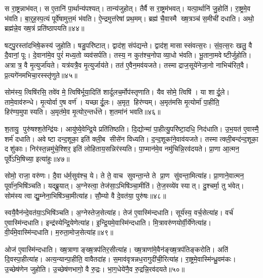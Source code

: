 स रा॒ष्ट्रन्नाभ॑वत्। स ए॒तानि॑ पा॒र्थान्य॑पश्यत्। तान्य॑जुहोत्। तैर्वै स रा॒ष्ट्रम॑भवत्। यत्पा॒र्थानि॑ जु॒होति॑। रा॒ष्ट्रमे॒व भ॑वति। बा॒र्॒ह॒स्प॒त्यं पूर्वे॑षामुत्त॒मं भ॑वति। ऐ॒न्द्रमुत्त॑रेषां प्रथ॒मम्। ब्रह्म॑ चै॒वास्मै ख्ष॒त्रञ्च॑ स॒मीची॑ दधाति। अथो॒ ब्रह्म॑न्ने॒व ख्ष॒त्रं प्रति॑ष्ठापयति॥४४॥

षट्पु॒रस्ता॑दभिषे॒कस्य॑ जुहोति। षडु॒परि॑ष्टात्। द्वाद॑श॒ संप॑द्यन्ते। द्वाद॑श॒ मासास्संवत्स॒रः। सं॒व॒त्स॒रः खलु॒ वै दै॒वानां॒ पूः। दे॒वाना॑मे॒व पुरं॑ मध्य॒तो व्यव॑सर्पति। तस्य॒ न कुत॑श्च॒नोपाव्या॒धो भ॑वति। भू॒ताना॒मवेष्टीर्जुहोति। अत्रात्र॒ वै मृ॒त्युर्जा॑यते। यत्र॑यत्रै॒व मृ॒त्युर्जाय॑ते। तत॑ ए॒वैन॒मव॑यजते। तस्माद्राज॒सूये॑नेजा॒नो नाभिच॑रित॒वै। प्र॒त्यगे॑नमभिचा॒रस्स्तृ॑णुते॥४५॥\anuvakamend[रु॒न्धे॒ सम॑ष्ट्या असिच्यत स्थापयति॒ जाय॑ते॒ पञ्च॑ च]

सोम॑स्य॒ त्विषि॑रसि॒ तवे॑व मे॒ त्विषि॑र्भूया॒दिति॑ शार्दूलच॒र्मोप॑स्तृणाति। यैव सोमे॒ त्विषि॑। या शार्दू॒ले। तामे॒वाव॑रुन्धे। मृ॒त्योर्वा ए॒ष वर्ण॑। यच्छार्दू॒लः। अ॒मृत॒ हिर॑ण्यम्। अ॒मृत॑मसि मृ॒त्योर्मा॑ पा॒हीति॒ हिर॑ण्य॒मुपास्यति। अ॒मृत॑मे॒व मृ॒त्योर॒न्तर्ध॑त्ते। श॒तमा॑नं भवति॥४६॥

श॒तायु॒ पुरु॑षश्श॒तेन्द्रि॑यः। आयु॑ष्ये॒वेन्द्रि॒ये प्रति॑तिष्ठति। दि॒द्योन्मा॑ पा॒हीत्यु॒परि॑ष्टा॒दधि॒ निद॑धाति। उ॒भ॒यत॑ ए॒वास्मै॒ शर्म॑ दधाति। अवेष्टा दन्द॒शूका॒ इति॑ क्ली॒ब सीसे॑न विध्यति। द॒न्द॒शूका॑ने॒वाव॑यजते। तस्मात्क्ली॒बन्द॑न्द॒शूका॒ दशु॑काः। निर॑स्त॒न्नमु॑चे॒श्शिर॒ इति॑ लोहिताय॒सन्निर॑स्यति। पा॒प्मान॑मे॒व नमु॑चिन्नि॒रव॑दयते। प्रा॒णा आ॒त्मन॒ पूर्वे॑ऽभि॒षिच्या॒ इत्या॑हुः॥४७॥

सोमो॒ राजा॒ वरु॑णः। दै॒वा ध॑र्म॒सुव॑श्च॒ ये। ते ते॒ वाच सुवन्ता॒न्ते ते प्रा॒ण सु॑वन्ता॒मित्या॑ह। प्रा॒णाने॒वात्मन॒ पूर्वा॑न॒भिषि॑ञ्चति। यद्ब्रू॒यात्। अ॒ग्नेस्त्वा॒ तेज॑सा॒ऽभिषि॑ञ्चा॒मीति॑। ते॒ज॒स्व्ये॑व स्यात्। दु॒श्चर्मा॒ तु भ॑वेत्। सोम॑स्य त्वा द्यु॒म्नेना॒भिषि॑ञ्चा॒मीत्या॑ह। सौ॒म्यो वै दे॒वत॑या॒ पुरु॑षः॥४८॥

स्वयै॒वैन॑न्दे॒वत॑या॒ऽभिषि॑ञ्चति। अ॒ग्नेस्तेज॒सेत्या॑ह। तेज॑ ए॒वास्मि॑न्दधाति। सूर्य॑स्य॒ वर्च॒सेत्या॑ह। वर्च॑ ए॒वास्मि॑न्दधाति। इन्द्र॑स्येन्द्रि॒येणेत्या॑ह। इ॒न्द्रि॒यमे॒वास्मि॑न्दधाति। मि॒त्रावरु॑णयोर्वी॒र्ये॑णेत्या॑ह। वी॒र्य॑मे॒वास्मि॑न्दधाति। म॒रुता॒मोज॒सेत्या॑ह॥४९॥

ओज॑ ए॒वास्मि॑न्दधाति। ख्ष॒त्राणाङ्ख्ष॒त्रप॑तिर॒सीत्या॑ह। ख्ष॒त्राणा॑मे॒वैन॑ङ्ख्ष॒त्रप॑तिङ्करोति। अति॑ दि॒वस्पा॒हीत्या॑ह। अत्य॒न्यान्पा॒हीति॒ वावैतदा॑ह। स॒माव॑वृत्रन्नध॒रागुदी॑ची॒रित्या॑ह। रा॒ष्ट्रमे॒वास्मि॑न्ध्रु॒वम॑कः। उ॒च्छेष॑णेन जुहोति। उ॒च्छेष॑णभागो॒ वै रु॒द्रः। भा॒ग॒धेये॑नै॒व रु॒द्रन्नि॒रव॑दयते॥५०॥

